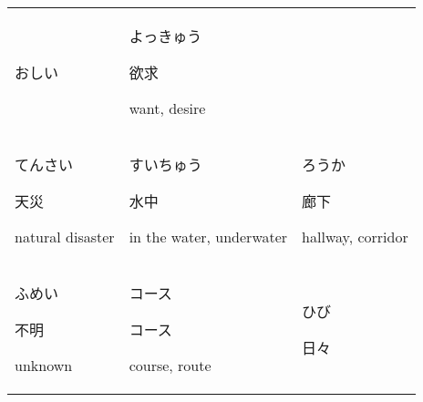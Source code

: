 \documentclass[12pt, a4j, landscape, dvipdfmx]{utarticle}
\begin{document}
\begin{minipage}[t][0pt]{\linewidth }
\begin{tabular}{||p{5.5cm}||p{5.5cm}||p{5.5cm}||}
おしい}\newline \rule{0pt}{3ex} \hspace*{.4cm} {\small 惜しい}\newline \rule{0pt}{3ex} \hspace*{.425cm} {\small almost, close}&\rule{0pt}{3ex} \hspace*{-.4cm} {\LARGE よっきゅう}\newline \rule{0pt}{3ex} \hspace*{.4cm} {\small 欲求}\newline \rule{0pt}{3ex} \hspace*{.425cm} {\small want, desire}\tabularnewline \hhline{|:=::=::=:|} \rule{0pt}{3ex} \hspace*{-.4cm} {\LARGE てんさい}\newline \rule{0pt}{3ex} \hspace*{.4cm} {\small 天災}\newline \rule{0pt}{3ex} \hspace*{.425cm} {\small natural disaster}&\rule{0pt}{3ex} \hspace*{-.4cm} {\LARGE すいちゅう}\newline \rule{0pt}{3ex} \hspace*{.4cm} {\small 水中}\newline \rule{0pt}{3ex} \hspace*{.425cm} {\small in the water, underwater}&\rule{0pt}{3ex} \hspace*{-.4cm} {\LARGE ろうか}\newline \rule{0pt}{3ex} \hspace*{.4cm} {\small 廊下}\newline \rule{0pt}{3ex} \hspace*{.425cm} {\small hallway, corridor}\tabularnewline \hhline{|:=::=::=:|} \rule{0pt}{3ex} \hspace*{-.4cm} {\LARGE ふめい}\newline \rule{0pt}{3ex} \hspace*{.4cm} {\small 不明}\newline \rule{0pt}{3ex} \hspace*{.425cm} {\small unknown}&\rule{0pt}{3ex} \hspace*{-.4cm} {\LARGE コース}\newline \rule{0pt}{3ex} \hspace*{.4cm} {\small コース}\newline \rule{0pt}{3ex} \hspace*{.425cm} {\small course, route}&\rule{0pt}{3ex} \hspace*{-.4cm} {\LARGE ひび}\newline \rule{0pt}{3ex} \hspace*{.4cm} {\small 日々}\newline \rule{0pt}{3ex} \hspace*{.425cm} 
\end{tabular}
\end{minipage}
\end{document}
